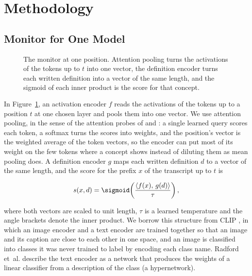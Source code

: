 \documentclass{article}
\newcommand{\etal}{et~al.\spacefactor=1000\relax}
\begin{document}
\section{Methodology}
\label{sec:method}

\subsection{Monitor for One Model}
\label{sec:monitor}

\begin{figure}[t]
\centering
\resizebox{0.78\textwidth}{!}{}
\caption{The monitor at one position. Attention pooling turns the activations of the tokens up to $t$ into one vector, the definition encoder turns each written definition into a vector of the same length, and the sigmoid of each inner product is the score for that concept.}
\label{fig:monitor}
\end{figure}

In Figure~\ref{fig:monitor}, an activation encoder $f$ reads the activations of the tokens up to a position $t$ at one chosen layer and pools them into one vector. We use attention pooling, in the sense of the attention probes of \cite{mckenzie2025} and \cite{kramar2026}: a single learned query scores each token, a softmax turns the scores into weights, and the position's vector is the weighted average of the token vectors, so the encoder can put most of its weight on the few tokens where a concept shows instead of diluting them as mean pooling does. A definition encoder $g$ maps each written definition $d$ to a vector of the same length, and the score for the prefix $x$ of the transcript up to $t$ is

\begin{equation}
s(x, d) = \sigmoid\!\left(\frac{\langle f(x),\, g(d)\rangle}{\tau}\right),
\label{eq:score}
\end{equation}

where both vectors are scaled to unit length, $\tau$ is a learned temperature and the angle brackets denote the inner product. We borrow this structure from CLIP \citep{radford2021}, in which an image encoder and a text encoder are trained together so that an image and its caption are close to each other in one space, and an image is classified into classes it was never trained to label by encoding each class name. Radford \etal{} describe the text encoder as a network that produces the weights of a linear classifier from a description of the class (a hypernetwork).
\end{document}
